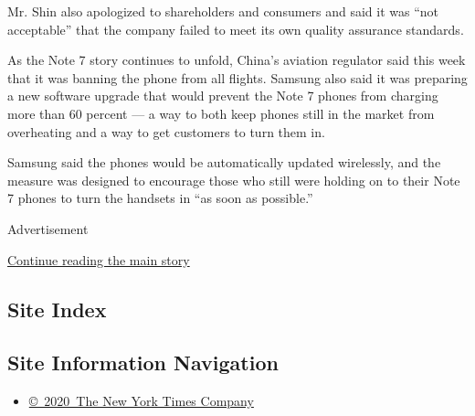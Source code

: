 Mr. Shin also apologized to shareholders and consumers and said it was
``not acceptable'' that the company failed to meet its own quality
assurance standards.

As the Note 7 story continues to unfold, China's aviation regulator said
this week that it was banning the phone from all flights. Samsung also
said it was preparing a new software upgrade that would prevent the Note
7 phones from charging more than 60 percent --- a way to both keep
phones still in the market from overheating and a way to get customers
to turn them in.

Samsung said the phones would be automatically updated wirelessly, and
the measure was designed to encourage those who still were holding on to
their Note 7 phones to turn the handsets in ``as soon as possible.''

Advertisement

\protect\hyperlink{after-bottom}{Continue reading the main story}

\hypertarget{site-index}{%
\subsection{Site Index}\label{site-index}}

\hypertarget{site-information-navigation}{%
\subsection{Site Information
Navigation}\label{site-information-navigation}}

\begin{itemize}
\tightlist
\item
  \href{https://help.nytimes3xbfgragh.onion/hc/en-us/articles/115014792127-Copyright-notice}{©~2020~The
  New York Times Company}
\end{itemize}


